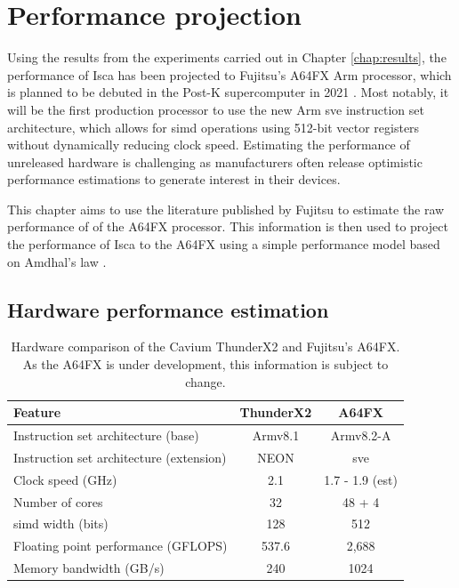 \documentclass[a4paper,11pt]{report}
\begin{document}
%
%
\chapter{Performance projection}
Using the results from the experiments carried out in Chapter \ref{chap:results}, the performance of Isca has been projected to Fujitsu's A64FX Arm processor, which is planned to be debuted in the Post-K supercomputer in 2021 \cite{yoshida2018fujitsu}. Most notably, it will be the first production processor to use the new Arm \gls{sve} instruction set architecture, which allows for \gls{simd} operations using 512-bit vector registers without dynamically reducing clock speed. Estimating the performance of unreleased hardware is challenging as manufacturers often release optimistic performance estimations to generate interest in their devices.
\par
This chapter aims to use the literature published by Fujitsu to estimate the raw performance of of the A64FX processor. This information is then used to project the performance of Isca to the A64FX using a simple performance model based on Amdhal's law \cite{bach2015est}.

\section{Hardware performance estimation}


\begin{table}[htp]
\caption[Comparison of ThunderX2 and A64FX hardware features]{Hardware comparison of the Cavium ThunderX2 and Fujitsu's A64FX. As the A64FX is under development, this information is subject to change.}
\begin{center}
\begin{tabular}{lcc}
\toprule
\textbf{Feature} 					& \textbf{ThunderX2} & \textbf{A64FX}	\\ \midrule
Instruction set architecture (base)		& Armv8.1			& Armv8.2-A		\\
Instruction set architecture (extension) 	& NEON			& \gls{sve}		\\
Clock speed (GHz) 					& 2.1				& 1.7 - 1.9 (est)		\\
Number of cores 					& 32				& 48 + 4			\\
\gls{simd} width (bits)				& 128			& 512			\\
Floating point performance (GFLOPS)	& 537.6			& 2,688			\\
Memory bandwidth (GB/s)				& 240			& 1024			\\



\bottomrule


\end{tabular}
\end{center}
\label{table:armcomp}
\end{table}%
\end{document}
